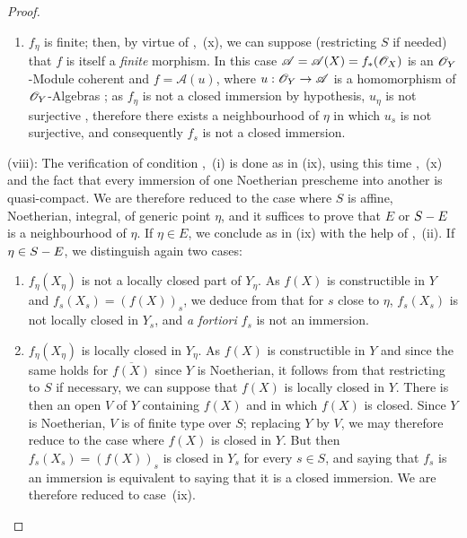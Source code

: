 \begin{proof}
\begin{enumerate}[label=\upshape{$\arabic{enumi}^\circ$}]
  \item $f_\eta$ is finite; then, by virtue of ,~(x), we can suppose (restricting $S$ if needed) that $f$ is itself a \emph{finite} morphism.
  In this case $\mathscr{A}=\mathscr{A}(X)=f_*(\mathscr{O}_X)$ is an $\mathscr{O}_Y$-Module coherent  and $f=\mathscr{A}(u)$, where $u:\mathscr{O}_Y\to\mathscr{A}$ is a homomorphism of $\mathscr{O}_Y$-Algebras ; as $f_\eta$ is not a closed immersion by hypothesis, $u_\eta$ is not surjective , therefore  there exists a neighbourhood of $\eta$ in which $u_s$ is not surjective, and consequently  $f_s$ is not a closed immersion.
\end{enumerate}

(viii): The verification of condition ,~(i) is done as in (ix), using this time ,~(x) and the fact that every immersion of one Noetherian prescheme into another is quasi-compact.
We are therefore reduced to the case where $S$ is affine, Noetherian, integral, of generic point $\eta$, and it suffices to prove that $E$ or $S- E$ is a neighbourhood of $\eta$.
If $\eta\in E$, we conclude as in (ix) with the help of ,~(ii).
If $\eta\in S- E$, we distinguish again two cases:
\begin{enumerate}[label=\upshape{$\arabic{enumi}^\circ$}]
  \item $f_\eta(X_\eta)$ is not a locally closed part of $Y_\eta$.
  As $f(X)$ is constructible in $Y$  and $f_s(X_s)=(f(X))_s$, we deduce from  that for $s$ close to $\eta$, $f_s(X_s)$ is not locally closed in $Y_s$, and \emph{a fortiori} $f_s$ is not an immersion.

  \item{} $f_\eta(X_\eta)$ is locally closed in $Y_\eta$.
  As $f(X)$ is constructible in $Y$  and since the same holds for $\overline{f(X)}$ since $Y$ is Noetherian, it follows from  that restricting to $S$ if necessary, we can suppose that $f(X)$ is locally closed in $Y$.
  There is then an open $V$ of $Y$ containing $f(X)$ and in which $f(X)$ is closed.
  Since $Y$ is Noetherian, $V$ is of finite type over $S$; replacing $Y$ by $V$, we may therefore reduce to the case where $f(X)$ is closed in $Y$.
  But then $f_s(X_s)=(f(X))_s$ is closed in $Y_s$ for every $s\in S$, and saying that $f_s$ is an immersion is equivalent to saying that it is a closed immersion.
  We are therefore reduced to case~(ix).
\end{enumerate}


\end{proof}
